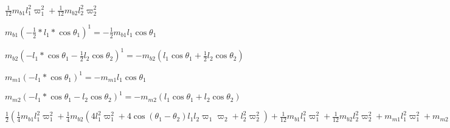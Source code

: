 \documentclass{article}
\begin{document}
$\frac{1}{12} m_{b 1} l_{1}^{2} \varpi _{1}^{2} +\frac{1}{12} m_{b 2} l_{2}^{2} \varpi _{2}^{2}$ 

$m_{b 1} ( -\frac{1}{2} \ast l_{1} \ast \cos  \theta _{1})^{1} = -\frac{1}{2} m_{b 1} l_{1} \cos  \theta _{1}$ 

$m_{b 2} ( -l_{1} \ast \cos  \theta _{1} -\frac{1}{2} l_{2} \cos  \theta _{2})^{1} = -m_{b 2} \left (l_{1} \cos  \theta _{1} +\frac{1}{2} l_{2} \cos  \theta _{2}\right )$ 

$m_{m 1} ( -l_{1} \ast \cos  \theta _{1})^{1} = -m_{m 1} l_{1} \cos  \theta _{1}$ 

$m_{m 2} ( -l_{1} \ast \cos  \theta _{1} -l_{2} \cos  \theta _{2})^{1} = -m_{m 2} \left (l_{1} \cos  \theta _{1} +l_{2} \cos  \theta _{2}\right )$ 

$\frac{1}{2} (\frac{1}{4} m_{b 1} l_{1}^{2} \varpi _{1}^{2} +\frac{1}{4} m_{b 2} \left (4 l_{1}^{2} \varpi _{1}^{2} +4 \cos  \left (\theta _{1} -\theta _{2}\right ) l_{1} l_{2} \varpi _{1} \varpi _{2} +l_{2}^{2} \varpi _{2}^{2}\right ) +\frac{1}{12} m_{b 1} l_{1}^{2} \varpi _{1}^{2} +\frac{1}{12} m_{b 2} l_{2}^{2} \varpi _{2}^{2} +m_{m 1} l_{1}^{2} \varpi _{1}^{2} +m_{m 2} \left (l_{1}^{2} \varpi _{1}^{2} +2 \cos  \left (\theta _{1} -\theta _{2}\right ) l_{1} l_{2} \varpi _{1} \varpi _{2} +l_{2}^{2} \varpi _{2}^{2}\right )) -g ( -\frac{1}{2} m_{b 1} l_{1} \cos  \theta _{1} -m_{b 2} \left (l_{1} \cos  \theta _{1} +\frac{1}{2} l_{2} \cos  \theta _{2}\right ) -m_{m 1} l_{1} \cos  \theta _{1} -m_{m 2} \left (l_{1} \cos  \theta _{1} +l_{2} \cos  \theta _{2}\right )) =\frac{1}{6} m_{b 1} l_{1}^{2} \varpi _{1}^{2} +\frac{1}{2} m_{m 1} l_{1}^{2} \varpi _{1}^{2} +\frac{1}{2} m_{m 2} l_{1}^{2} \varpi _{1}^{2} +\frac{1}{2} m_{m 2} l_{2}^{2} \varpi _{2}^{2} +\frac{1}{2} l_{1}^{2} \varpi _{1}^{2} m_{b 2} +\frac{1}{6} l_{2}^{2} m_{b 2} \varpi _{2}^{2} +\frac{1}{2} g m_{b 1} l_{1} \cos  \theta _{1} +g m_{m 1} l_{1} \cos  \theta _{1} +g m_{m 2} l_{1} \cos  \theta _{1} +g m_{m 2} l_{2} \cos  \theta _{2} +g l_{1} m_{b 2} \cos  \theta _{1} +\frac{1}{2} g l_{2} m_{b 2} \cos  \theta _{2} +m_{m 2} l_{1} l_{2} \varpi _{1} \varpi _{2} \cos  \left (\theta _{1} -\theta _{2}\right ) +\frac{1}{2} l_{1} l_{2} \varpi _{1} m_{b 2} \varpi _{2} \cos  \left (\theta _{1} -\theta _{2}\right )$ 
\end{document}
